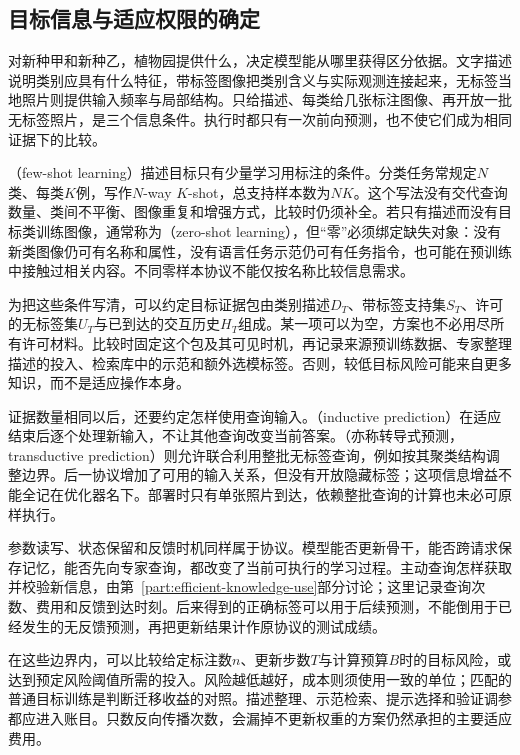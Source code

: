 \subsection{目标信息与适应权限的确定}
\label{sec:ket-transfer-evidence}

对新种甲和新种乙，植物园提供什么，决定模型能从哪里获得区分依据。文字描述说明类别应具有什么特征，带标签图像把类别含义与实际观测连接起来，无标签当地照片则提供输入频率与局部结构。只给描述、每类给几张标注图像、再开放一批无标签照片，是三个信息条件。执行时都只有一次前向预测，也不使它们成为相同证据下的比较。

（few-shot learning）描述目标只有少量学习用标注的条件。分类任务常规定$N$类、每类$K$例，写作$N$-way $K$-shot，总支持样本数为$NK$。这个写法没有交代查询数量、类间不平衡、图像重复和增强方式，比较时仍须补全。若只有描述而没有目标类训练图像，通常称为（zero-shot learning），但“零”必须绑定缺失对象：没有新类图像仍可有名称和属性，没有语言任务示范仍可有任务指令，也可能在预训练中接触过相关内容。不同零样本协议不能仅按名称比较信息需求。

为把这些条件写清，可以约定目标证据包由类别描述$D_T$、带标签支持集$S_T$、许可的无标签集$U_T$与已到达的交互历史$H_T$组成。某一项可以为空，方案也不必用尽所有许可材料。比较时固定这个包及其可见时机，再记录来源预训练数据、专家整理描述的投入、检索库中的示范和额外选模标签。否则，较低目标风险可能来自更多知识，而不是适应操作本身。

证据数量相同以后，还要约定怎样使用查询输入。（inductive prediction）在适应结束后逐个处理新输入，不让其他查询改变当前答案。（亦称转导式预测，transductive prediction）则允许联合利用整批无标签查询，例如按其聚类结构调整边界。后一协议增加了可用的输入关系，但没有开放隐藏标签；这项信息增益不能全记在优化器名下。部署时只有单张照片到达，依赖整批查询的计算也未必可原样执行。

参数读写、状态保留和反馈时机同样属于协议。模型能否更新骨干，能否跨请求保存记忆，能否先向专家查询，都改变了当前可执行的学习过程。主动查询怎样获取并校验新信息，由第~\ref{part:efficient-knowledge-use}部分讨论；这里记录查询次数、费用和反馈到达时刻。后来得到的正确标签可以用于后续预测，不能倒用于已经发生的无反馈预测，再把更新结果计作原协议的测试成绩。

在这些边界内，可以比较给定标注数$n$、更新步数$T$与计算预算$B$时的目标风险，或达到预定风险阈值所需的投入。风险越低越好，成本则须使用一致的单位；匹配的普通目标训练是判断迁移收益的对照。描述整理、示范检索、提示选择和验证调参都应进入账目。只数反向传播次数，会漏掉不更新权重的方案仍然承担的主要适应费用。


